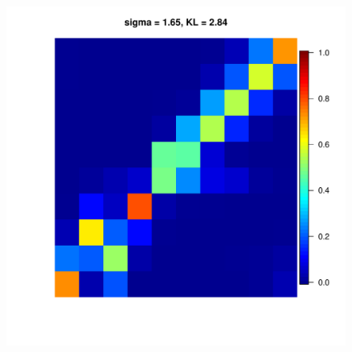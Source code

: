 \documentclass[11pt, oneside]{article}   	%
\begin{document}
\begin{figure}[h!]
{\begin{minipage}[t]{.3\textwidth}
		\end{minipage} 
		\hfill
		\begin{minipage}[t]{.3\textwidth}
			\centering
			\includegraphics[width=\textwidth]{figures/Pseudo_alpha1dot5N100n100run1sd1dot65.pdf}
			
		\end{minipage} 
		
	}

\end{figure}
\end{document}
